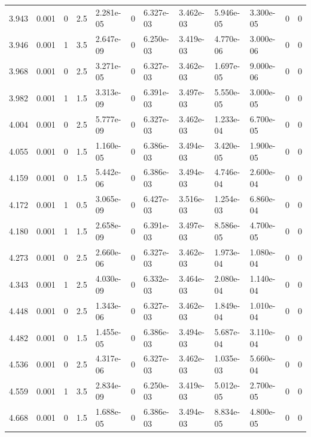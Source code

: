 \documentclass[preview]{standalone}
\begin{document}
{{\begin{tabular}{L{1.2cm}C{1.2cm} C{0.3cm}C{0.5cm} C{1.4cm}C{1.4cm} C{1.4cm}C{1.4cm} C{1.6cm}C{1.6cm} C{1.6cm}C{1.6cm}}
  3.943  &  0.001  & 0     & 2.5 &  2.281e-05  & 0  &  6.327e-03&   3.462e-03& 5.946e-05 & 3.300e-05   &  0 & 0  \\ 
  3.946  &  0.001  & 1     & 3.5 &  2.647e-09  & 0  &  6.250e-03&   3.419e-03& 4.770e-06 & 3.000e-06   &  0 & 0  \\ 
  3.968  &  0.001  & 0     & 2.5 &  3.271e-05  & 0  &  6.327e-03&   3.462e-03& 1.697e-05 & 9.000e-06   &  0 & 0  \\ 
  3.982  &  0.001  & 1     & 1.5 &  3.313e-09  & 0  &  6.391e-03&   3.497e-03& 5.550e-05 & 3.000e-05   &  0 & 0  \\ 
  4.004  &  0.001  & 0     & 2.5 &  5.777e-09  & 0  &  6.327e-03&   3.462e-03& 1.233e-04 & 6.700e-05   &  0 & 0  \\ 
  4.055  &  0.001  & 0     & 1.5 &  1.160e-05  & 0  &  6.386e-03&   3.494e-03& 3.420e-05 & 1.900e-05   &  0 & 0  \\ 
  4.159  &  0.001  & 0     & 1.5 &  5.442e-06  & 0  &  6.386e-03&   3.494e-03& 4.746e-04 & 2.600e-04   &  0 & 0  \\ 
  4.172  &  0.001  & 1     & 0.5 &  3.065e-09  & 0  &  6.427e-03&   3.516e-03& 1.254e-03 & 6.860e-04   &  0 & 0  \\ 
  4.180  &  0.001  & 1     & 1.5 &  2.658e-09  & 0  &  6.391e-03&   3.497e-03& 8.586e-05 & 4.700e-05   &  0 & 0  \\ 
  4.273  &  0.001  & 0     & 2.5 &  2.660e-06  & 0  &  6.327e-03&   3.462e-03& 1.973e-04 & 1.080e-04   &  0 & 0  \\ 
  4.343  &  0.001  & 1     & 2.5 &  4.030e-09  & 0  &  6.332e-03&   3.464e-03& 2.080e-04 & 1.140e-04   &  0 & 0  \\ 
  4.448  &  0.001  & 0     & 2.5 &  1.343e-06  & 0  &  6.327e-03&   3.462e-03& 1.849e-04 & 1.010e-04   &  0 & 0  \\ 
  4.482  &  0.001  & 0     & 1.5 &  1.455e-05  & 0  &  6.386e-03&   3.494e-03& 5.687e-04 & 3.110e-04   &  0 & 0  \\ 
  4.536  &  0.001  & 0     & 2.5 &  4.317e-06  & 0  &  6.327e-03&   3.462e-03& 1.035e-03 & 5.660e-04   &  0 & 0  \\ 
  4.559  &  0.001  & 1     & 3.5 &  2.834e-09  & 0  &  6.250e-03&   3.419e-03& 5.012e-05 & 2.700e-05   &  0 & 0  \\ 
  4.668  &  0.001  & 0     & 1.5 &  1.688e-05  & 0  &  6.386e-03&   3.494e-03& 8.834e-05 & 4.800e-05   &  0 & 0  \\ 
\hline 
\end{tabular} 

}}
\end{document}
